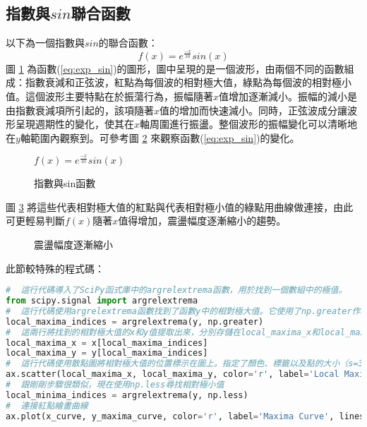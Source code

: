 \subsection{指數與$sin$聯合函數}
以下為一個指數與$sin$的聯合函數：
\begin{equation}\label{eq:exp_sin}
f(x)={e^{\frac{-x}{10}}} sin(x)
\end{equation}
圖 \ref{fig:exp_sin_1} 為函數(\ref{eq:exp_sin})的圖形，圖中呈現的是一個波形，由兩個不同的函數組成：指數衰減和正弦波，紅點為每個波的相對極大值，綠點為每個波的相對極小值。這個波形主要特點在於振蕩行為，振幅隨著$x$值增加逐漸減小。振幅的減小是由指數衰減項所引起的，該項隨著$x$值的增加而快速減小。同時，正弦波成分讓波形呈現週期性的變化，使其在$x$軸周圍進行振盪。整個波形的振幅變化可以清晰地在$y$軸範圍內觀察到。可參考圖 \ref{fig:exp_sin_2} 來觀察函數(\ref{eq:exp_sin})的變化。
\begin{figure}[h]
    \caption{$f(x) = {e^{\frac{-x}{10}}} sin(x)$}
    \label{fig:exp_sin_1}
\end{figure}
\begin{figure}[h]
    \centering
    \caption{指數與sin函數}
    \label{fig:exp_sin_2}
\end{figure}
\newpage
圖 \ref{fig:exp_sin_3} 將這些代表相對極大值的紅點與代表相對極小值的綠點用曲線做連接，由此可更輕易判斷$f(x)$隨著$x$值得增加，震盪幅度逐漸縮小的趨勢。
\begin{figure}[h]
    \caption{震盪幅度逐漸縮小}
    \label{fig:exp_sin_3}
\end{figure}
此節較特殊的程式碼：
\begin{lstlisting}[language=Python]
#  這行代碼導入了SciPy函式庫中的argrelextrema函數，用於找到一個數組中的極值。
from scipy.signal import argrelextrema
#  這行代碼使用argrelextrema函數找到了函數y中的相對極大值。它使用了np.greater作為比較函數，以確定哪些值被視為極大值。
local_maxima_indices = argrelextrema(y, np.greater)
#  這兩行將找到的相對極大值的x和y值提取出來，分別存儲在local_maxima_x和local_maxima_y中。
local_maxima_x = x[local_maxima_indices]
local_maxima_y = y[local_maxima_indices]
#  這行代碼使用散點圖將相對極大值的位置標示在圖上。指定了顏色、標籤以及點的大小（s=30）。zorder參數用於指定圖層順序，確保這些點在圖形的最上層。
ax.scatter(local_maxima_x, local_maxima_y, color='r', label='Local Maxima', s=30, zorder=2)
#  跟剛剛步驟很類似，現在使用np.less尋找相對極小值
local_minima_indices = argrelextrema(y, np.less)
#  連接紅點繪畫曲線
ax.plot(x_curve, y_maxima_curve, color='r', label='Maxima Curve', linestyle='-', linewidth=2)
\end{lstlisting}
